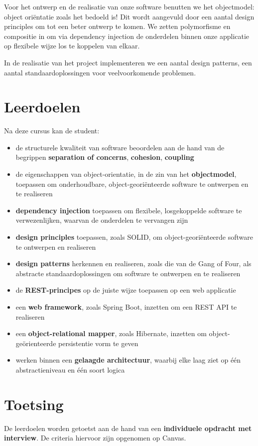 Voor het ontwerp en de realisatie van onze software benutten we 
het objectmodel: object oriëntatie zoals het bedoeld is! 
Dit wordt aangevuld door een aantal design principles om tot een 
beter ontwerp te komen. We zetten polymorfisme en compositie in 
om via dependency injection de onderdelen binnen onze applicatie 
op flexibele wijze los te koppelen van elkaar.

In de realisatie van het project implementeren we een aantal
design patterns, een aantal standaardoplossingen voor 
veelvoorkomende problemen.

\newpage
\section{Leerdoelen}
Na deze cursus kan de student:
\begin{itemize}
    \item de structurele kwaliteit van software beoordelen aan de hand van de begrippen \textbf{separation of concerns}, \textbf{cohesion}, \textbf{coupling}
    \item de eigenschappen van object-orientatie, in de zin van het \textbf{objectmodel}, toepassen om onderhoudbare, object-georiënteerde software te ontwerpen en te realiseren
    \item \textbf{dependency injection} toepassen om flexibele, losgekoppelde software te verwezenlijken, waarvan de onderdelen te vervangen zijn
    \item \textbf{design principles} toepassen, zoals SOLID, om object-georiënteerde software te ontwerpen en realiseren
    \item \textbf{design patterns} herkennen en realiseren, zoals die van de Gang of Four, als abstracte standaardoplossingen om software te ontwerpen en te realiseren
    \item de \textbf{REST-principes} op de juiste wijze toepassen op een web applicatie
    \item een \textbf{web framework}, zoals Spring Boot, inzetten om een REST API te realiseren
    \item een \textbf{object-relational mapper}, zoals Hibernate, inzetten om object-geörienteerde persistentie vorm te geven
    \item werken binnen een \textbf{gelaagde architectuur}, waarbij elke laag ziet op één abstractieniveau en één soort logica
\end{itemize}

\section{Toetsing}
De leerdoelen worden getoetst aan de hand van een \textbf{individuele opdracht met interview}.
De criteria hiervoor zijn opgenomen op Canvas. 

